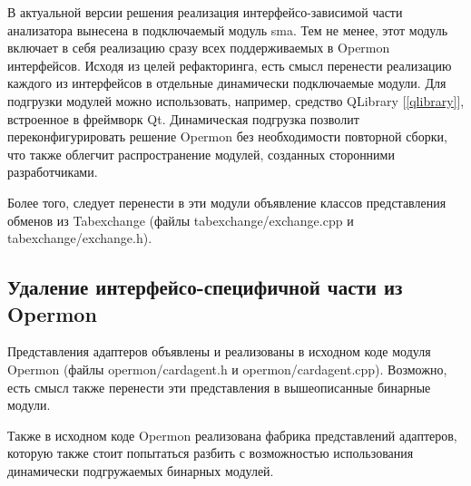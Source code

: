 В актуальной версии решения реализация интерфейсо-зависимой части анализатора вынесена в подключаемый модуль sma. Тем не менее, этот модуль включает в себя реализацию сразу всех поддерживаемых в Opermon интерфейсов. Исходя из целей рефакторинга, есть смысл перенести реализацию каждого из интерфейсов в отдельные динамически подключаемые модули. Для подгрузки модулей можно использовать, например, средство QLibrary [\ref{qlibrary}], встроенное в фреймворк Qt. Динамическая подгрузка позволит переконфигурировать решение Opermon без необходимости повторной сборки, что также облегчит распространение модулей, созданных сторонними разработчиками.

Более того, следует перенести в эти модули объявление классов представления обменов из Tabexchange (файлы tabexchange/exchange.cpp и tabexchange/exchange.h).

\subsection{Удаление интерфейсо-специфичной части из Opermon}

Представления адаптеров объявлены и реализованы в исходном коде модуля Opermon (файлы opermon/cardagent.h и opermon/cardagent.cpp). Возможно, есть смысл также перенести эти представления в вышеописанные бинарные модули. 

Также в исходном коде Opermon реализована фабрика представлений адаптеров, которую также стоит попытаться разбить с возможностью использования динамически подгружаемых бинарных модулей.